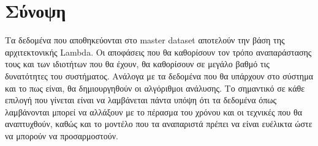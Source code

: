 \section{Σύνοψη}
Τα δεδομένα που αποθηκεύονται στο master dataset αποτελούν την βάση της αρχιτεκτονικής Lambda. Οι αποφάσεις που θα καθορίσουν τον τρόπο αναπαράστασης τους και των ιδιοτήτων που θα έχουν, θα καθορίσουν σε μεγάλο βαθμό τις δυνατότητες του συστήματος. Ανάλογα με τα δεδομένα που θα υπάρχουν στο σύστημα και το πως είναι, θα δημιουργηθούν οι αλγόριθμοι ανάλυσης. Το σημαντικό σε κάθε επιλογή που γίνεται είναι να λαμβάνεται πάντα υπόψη ότι τα δεδομένα όπως λαμβάνονται μπορεί να αλλάξουν με το πέρασμα του χρόνου και οι τεχνικές που θα αναπτυχθούν, καθώς και το μοντέλο που τα αναπαριστά πρέπει να είναι ευέλικτα ώστε να μπορούν να προσαρμοστούν. 